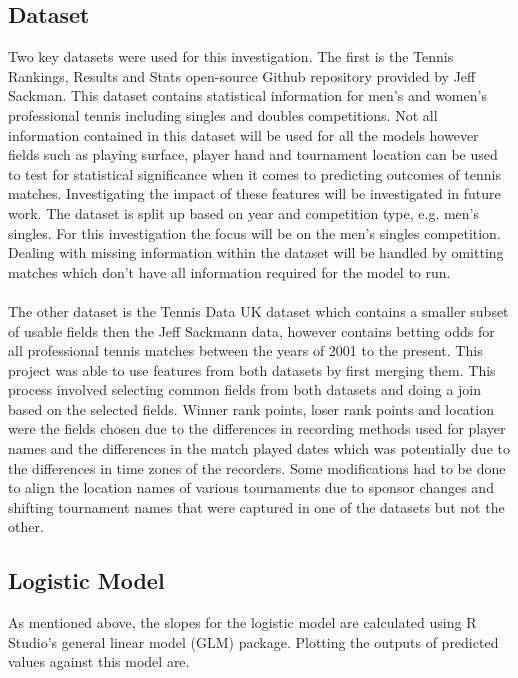 \documentclass[12pt,a4paper]{article}
\begin{document}
\subsection{Dataset}
Two key datasets were used for this investigation. The first
is the Tennis Rankings, Results and Stats open-source
Github repository\cite{sackmann_jeffsackmanntennis_atp_2024} provided by Jeff Sackman.
This dataset contains
statistical information for men's and women's professional tennis including singles and
doubles competitions. Not all information contained in this dataset will be used for all
the models however fields such as playing surface, player hand and tournament location
can be used to test for statistical significance when it comes to predicting outcomes of
tennis matches. Investigating the impact of these features will be investigated in future
work. The dataset is split up based on year and competition type, e.g. men's
singles. For this investigation the focus will be on the men's singles competition.
Dealing with missing information within the dataset will be handled by omitting matches
which don't have all information required for the model to run.
\\
\\
The other dataset is the Tennis Data UK \cite{tennis_data_uk} dataset which contains a
smaller subset of usable fields then the Jeff Sackmann data, however contains betting
odds for all professional tennis matches between the years of 2001 to the present. This
project was able to use features from both datasets by first merging them. This process
involved selecting common fields from both datasets and doing a join based on the selected
fields. Winner rank points, loser rank points and location were the fields chosen due to
the differences in recording methods used for player names and the differences in the match
played dates which was potentially due to the differences in time zones of the recorders.
Some modifications had to be done to align the location names of various tournaments due
to sponsor changes and shifting tournament names that were captured in one of the datasets
but not the other.

\subsection{Logistic Model}
As mentioned above, the slopes for the logistic model are
calculated using R Studio's general linear model (GLM) package. Plotting the
outputs of predicted values against this model are.
\end{document}
